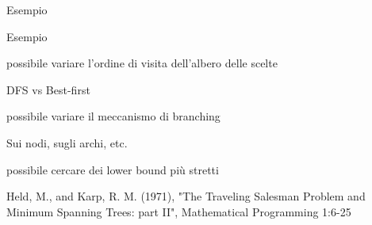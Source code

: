 \begin{frame}{Esempio}

\vspace{-9pt}




\end{frame}

\begin{frame}{Esempio}

\vspace{-9pt}

\begin{myboxtitle}
\BIL
\item \EE possibile variare l'ordine di visita dell'albero delle scelte
  \BI
  \item DFS vs Best-first
  \EI
\item \EE possibile variare il meccanismo di branching
  \BI
  \item Sui nodi, sugli archi, etc.
  \EI
\item \EE possibile cercare dei lower bound più stretti 
  \BI
  \item Held, M., and Karp, R. M. (1971), "The Traveling Salesman Problem and Minimum Spanning Trees: part II", Mathematical Programming 1:6-25
  \EI
\EIL
\end{myboxtitle}

\end{frame}






